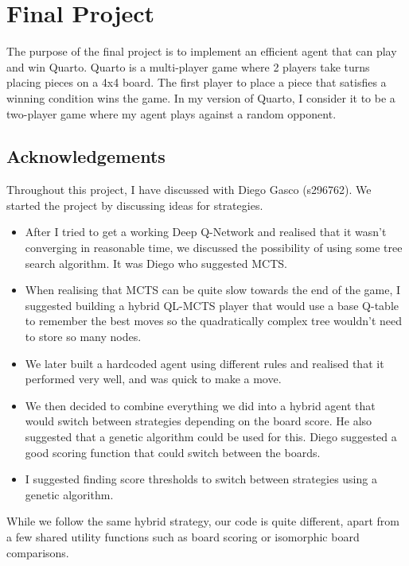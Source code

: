 
\section{Final Project}

The purpose of the final project is to implement an efficient agent that can play and win Quarto. Quarto is a multi-player game where 2 players take turns placing pieces on a 4x4 board. The first player to place a piece that satisfies a winning condition wins the game. In my version of Quarto, I consider it to be a two-player game where my agent plays against a random opponent.

\subsection{Acknowledgements}

Throughout this project, I have discussed with Diego Gasco (s296762). We started the project by discussing ideas for strategies.

\begin{itemize}
    \item After I tried to get a working Deep Q-Network and realised that it wasn't converging in reasonable time, we discussed the possibility of using some tree search algorithm. It was Diego who suggested MCTS.
    \item When realising that MCTS can be quite slow towards the end of the game, I suggested building a hybrid QL-MCTS player that would use a base Q-table to remember the best moves so the quadratically complex tree wouldn't need to store so many nodes.
    \item We later built a hardcoded agent using different rules and realised that it performed very well, and was quick to make a move.
    \item We then decided to combine everything we did into a hybrid agent that would switch between strategies depending on the board score. He also suggested that a genetic algorithm could be used for this. Diego suggested a good scoring function that could switch between the boards.
    \item I suggested finding score thresholds to switch between strategies using a genetic algorithm.
\end{itemize}

While we follow the same hybrid strategy, our code is quite different, apart from a few shared utility functions such as board scoring or isomorphic board comparisons.


